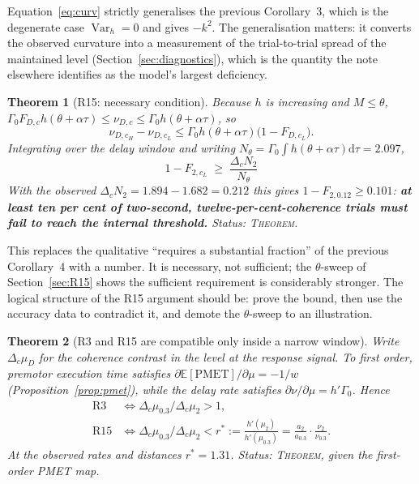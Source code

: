 \documentclass[11pt,a4paper]{article}
\newcommand{\E}{\mathbb{E}}
\newcommand{\Var}{\operatorname{Var}}
\newcommand{\dd}{\mathrm{d}}
\newcommand{\Mrv}{M}
\theoremstyle{plain}
\newtheorem{theorem}{Theorem}
\theoremstyle{remark}
\begin{document}
Equation~\eqref{eq:curv} strictly generalises the previous Corollary~3, which is the
degenerate case $\Var_h=0$ and gives $-k^2$. The generalisation matters: it converts the
observed curvature into a measurement of the trial-to-trial spread of the maintained
level (Section~\ref{sec:diagnostics}), which is the quantity the note elsewhere identifies
as the model's largest deficiency.

\begin{theorem}[R15: necessary condition]
\label{thm:R15}
Because $h$ is increasing and $\Mrv\le\theta$,
$\Gamma_0F_{D,c}h(\theta+\alpha\tau)\le\nu_{D,c}\le\Gamma_0h(\theta+\alpha\tau)$, so
\begin{equation}
\nu_{D,c_H}-\nu_{D,c_L}\le\Gamma_0h(\theta+\alpha\tau)\bigl(1-F_{D,c_L}\bigr).
\end{equation}
Integrating over the delay window and writing $N_\theta=\Gamma_0\int h(\theta+\alpha\tau)\dd\tau=2.097$,
\begin{equation}
\boxed{\;1-F_{2,c_L}\;\ge\;\frac{\Delta_c N_{2}}{N_\theta}\;}
\end{equation}
With the observed $\Delta_cN_2=1.894-1.682=0.212$ this gives
$1-F_{2,0.12}\ge0.101$: \textbf{at least ten per cent of two-second, twelve-per-cent-coherence
trials must fail to reach the internal threshold.} \emph{Status: \textsc{Theorem}.}
\end{theorem}

This replaces the qualitative ``requires a substantial fraction'' of the previous
Corollary~4 with a number. It is necessary, not sufficient; the $\theta$-sweep of
Section~\ref{sec:R15} shows the sufficient requirement is considerably stronger. The
logical structure of the R15 argument should be: prove the bound, then use the accuracy
data to contradict it, and demote the $\theta$-sweep to an illustration.

\begin{theorem}[R3 and R15 are compatible only inside a narrow window]
\label{thm:R3R15}
Write $\Delta_c\mu_D$ for the coherence contrast in the level at the response signal. To
first order, premotor execution time satisfies $\partial\E[\text{PMET}]/\partial\mu=-1/w$
(Proposition~\ref{prop:pmet}), while the delay rate satisfies
$\partial\nu/\partial\mu=h'\Gamma_0$. Hence
\begin{align}
\text{R3}&\iff \Delta_c\mu_{0.3}/\Delta_c\mu_{2}>1,\\
\text{R15}&\iff \Delta_c\mu_{0.3}/\Delta_c\mu_{2}<r^{*}:=\frac{h'(\mu_2)}{h'(\mu_{0.3})}
=\frac{a_2}{a_{0.3}}\cdot\frac{\nu_2}{\nu_{0.3}} .
\end{align}
At the observed rates and distances $r^{*}=1.31$.
\emph{Status: \textsc{Theorem}, given the first-order PMET map.}
\end{theorem}
\end{document}
